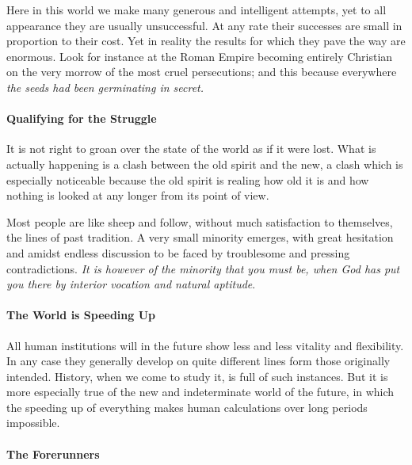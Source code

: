 \begin{quotex}
Here in this world we make many generous and intelligent attempts, yet to all appearance they are usually unsuccessful. At any rate their successes are small in proportion to their cost. Yet in reality the results for which they pave the way are enormous. Look for instance at the Roman Empire becoming entirely Christian on the very morrow of the most cruel persecutions; and this because everywhere \emph{the seeds had been germinating in secret.}
\end{quotex}


\paragraph{Qualifying for the Struggle}


\begin{quotationx}
It is not right to groan over the state of the world as if it were lost. What is actually happening is a clash between the old spirit and the new, a clash which is especially noticeable because the old spirit is realing how old it is and how nothing is looked at any longer from its point of view.

Most people are like sheep and follow, without much satisfaction to themselves, the lines of past tradition. A very small minority emerges, with great hesitation and amidst endless discussion to be faced by troublesome and pressing contradictions. \emph{It is however of the minority that you must be, when God has put you there by interior vocation and natural aptitude}.
\end{quotationx}


\paragraph{The World is Speeding Up}


\begin{quotex}
All human institutions will in the future show less and less vitality and flexibility. In any case they generally develop on quite different lines form those originally intended. History, when we come to study it, is full of such instances. But it is more especially true of the new and indeterminate world of the future, in which the speeding up of everything makes human calculations over long periods impossible.
\end{quotex}


\paragraph{The Forerunners}


